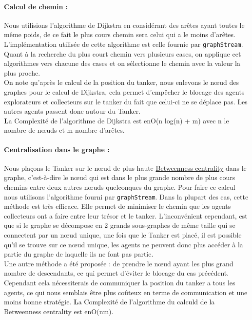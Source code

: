 \documentclass[10pt]{article}
\newcommand\tab[1][0.65cm]{\hspace*{#1}}
\begin{document}
\paragraph{Calcul de chemin :} Nous utilisions l'algorithme de Dijkstra en considérant des arêtes ayant toutes le même poids, de ce fait le plus cours chemin sera celui qui a le moins d'arêtes. L'implémentation utilisée de cette algorithme est celle fournie par \texttt{graphStream}. Quant à la recherche du plus court chemin vers plusieurs cases, on applique cet algorithmes vers chacune des cases et on sélectionne le chemin avec la valeur la plus proche.\\
\tab On note qu'après le calcul de la position du tanker, nous enlevons le n\oe{}ud des graphes pour le calcul de Dijkstra, cela permet d'empêcher le blocage des agents explorateurs et collecteurs sur le tanker du fait que celui-ci ne se déplace pas. Les autres agents passent donc autour du Tanker.\\
\tab \textbf La Complexité de l'algorithme de Dijkstra est en{O(n log(n) + m)} avec n le nombre de n\oe{}uds et m nombre d'arêtes.

\paragraph{Centralisation dans le graphe :} Nous plaçons le Tanker sur le n\oe{}ud de plus haute \href{https://en.wikipedia.org/wiki/Betweenness_centrality}{Betweenness centrality} dans le graphe, c'est-à-dire le n\oe{}ud  qui est dans le plus grande nombre de plus cours chemins entre deux autres n\oe{}uds quelconques du graphe. Pour faire ce calcul nous utilisons l'algorithme fourni par \texttt{graphStream}. Dans la plupart des cas, cette méthode est très efficace. Elle permet de minimiser le chemin que les agents collecteurs ont a faire entre leur trésor et le tanker. L'inconvénient cependant, est que si le graphe se décompose en 2 grands sous-graphes de même taille qui se connectent par un n\oe{}ud unique, une fois que le Tanker est placé, il est possible qu'il se trouve sur ce n\oe{}ud unique, les agents ne peuvent donc plus accéder à la partie du graphe de laquelle ils ne font pas partie.\\
\tab Une autre méthode a été proposée : de prendre le n\oe{}ud ayant les plus grand nombre de descendants, ce qui permet d'éviter le blocage du cas précédent. Cependant cela nécessiterais de communiquer la position du tanker a tous les agents, ce qui nous semblais être plus coûteux en terme de communication et une moins bonne stratégie.
\tab \textbf La Complexité de l'algorithme du calculd de la Betweenness centrality est  en{O(nm)}.
\end{document}
